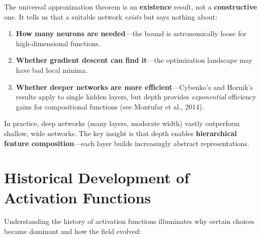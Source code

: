The universal approximation theorem is an \textbf{existence} result, not a \textbf{constructive} one. It tells us that a suitable network \emph{exists} but says nothing about:
\begin{enumerate}
    \item \textbf{How many neurons are needed}---the bound is astronomically loose for high-dimensional functions.
    \item \textbf{Whether gradient descent can find it}---the optimization landscape may have bad local minima.
    \item \textbf{Whether deeper networks are more efficient}---Cybenko's and Hornik's results apply to single hidden layers, but depth provides \emph{exponential} efficiency gains for compositional functions (see Montufar et al., 2014).
\end{enumerate}

In practice, deep networks (many layers, moderate width) vastly outperform shallow, wide networks. The key insight is that depth enables \textbf{hierarchical feature composition}---each layer builds increasingly abstract representations.

\section{Historical Development of Activation Functions}

Understanding the history of activation functions illuminates why certain choices became dominant and how the field evolved:


